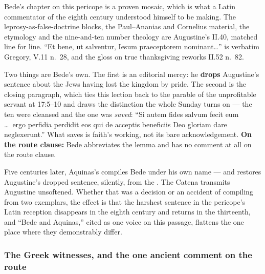 \begin{witnessnote}
Bede's chapter on this pericope is a proven mosaic, which is what a Latin
commentator of the eighth century understood himself to be making. The leprosy-as-false-doctrine blocks, the
Paul--Ananias and Cornelius material, the  etymology and the
nine-and-ten number theology are Augustine's  II.40, matched
line for line. ``Et bene, ut salventur, Iesum praeceptorem nominant\dots'' is
verbatim Gregory,  V.11 n.~28, and the gloss on true thanksgiving
reworks  II.52 n.~82.

Two things are Bede's own. The first is an editorial mercy: he \textbf{drops}
Augustine's sentence about the Jews having lost the kingdom by pride. The
second is the closing paragraph, which ties this lection back to the parable of
the unprofitable servant at 17:5--10 and draws the distinction the whole
Sunday turns on --- the ten were cleansed and the one was \textit{saved}:
``Si autem fides salvum fecit eum \dots\ ergo perfidia perdidit eos qui de
acceptis beneficiis Deo gloriam dare neglexerunt.'' What saves is faith's
working, not its bare acknowledgement. \textbf{On the route clause:} Bede
abbreviates the lemma and has no comment at all on the route clause.
\end{witnessnote}

Five centuries later, Aquinas's  compiles Bede under his own
name --- and restores Augustine's dropped sentence, silently, from the
. The Catena transmits Augustine unsoftened. Whether that was
a decision or an accident of compiling from two exemplars, the effect is that
the harshest sentence in the pericope's Latin reception disappears in the
eighth century and returns in the thirteenth, and ``Bede and Aquinas,'' cited as
one voice on this passage, flattens the one place where they demonstrably
differ.

\subsubsection*{The Greek witnesses, and the one ancient comment on the route}

